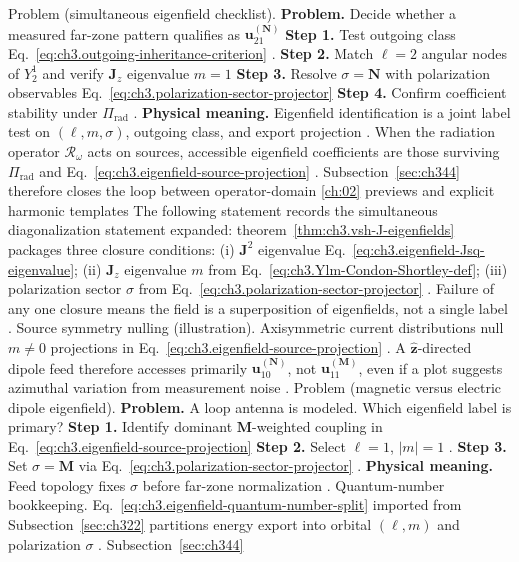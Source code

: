 Problem (simultaneous eigenfield checklist). \textbf{Problem.} Decide whether a measured far-zone pattern qualifies as \(\mathbf{u}_{21}^{(\mathbf{N})}\)
\textbf{Step 1.} Test outgoing class Eq.~\eqref{eq:ch3.outgoing-inheritance-criterion} .
\textbf{Step 2.} Match \(\ell=2\) angular nodes of \(Y_{2}^{1}\) and verify \(\mathbf{J}_{z}\) eigenvalue \(m=1\)
\textbf{Step 3.} Resolve \(\sigma=\mathbf{N}\) with polarization observables Eq.~\eqref{eq:ch3.polarization-sector-projector}
\textbf{Step 4.} Confirm coefficient stability under \(\Pi_{\mathrm{rad}}\) .
\textbf{Physical meaning.} Eigenfield identification is a joint label test on \((\ell,m,\sigma)\), outgoing class, and
export projection .
When the radiation operator \(\mathcal{R}_\omega\) acts on sources, accessible eigenfield coefficients are those surviving
\(\Pi_{\mathrm{rad}}\) and Eq.~\eqref{eq:ch3.eigenfield-source-projection} . Subsection~\ref{sec:ch344}
therefore closes the loop between operator-domain \ref{ch:02} previews and explicit harmonic templates
The following statement records the simultaneous diagonalization statement expanded: theorem~\ref{thm:ch3.vsh-J-eigenfields} packages three closure conditions: (i) \(\mathbf{J}^{2}\) eigenvalue
Eq.~\eqref{eq:ch3.eigenfield-Jsq-eigenvalue}; (ii) \(\mathbf{J}_{z}\) eigenvalue \(m\) from
Eq.~\eqref{eq:ch3.Ylm-Condon-Shortley-def}; (iii) polarization sector \(\sigma\) from
Eq.~\eqref{eq:ch3.polarization-sector-projector} . Failure of any one
closure means the field is a superposition of eigenfields, not a single label .
Source symmetry nulling (illustration). Axisymmetric current distributions null \(m\neq0\) projections in Eq.~\eqref{eq:ch3.eigenfield-source-projection}
. A \(\hat{\mathbf{z}}\)-directed dipole feed therefore accesses primarily
\(\mathbf{u}_{10}^{(\mathbf{N})}\), not \(\mathbf{u}_{11}^{(\mathbf{M})}\), even if a plot suggests azimuthal variation
from measurement noise .
Problem (magnetic versus electric dipole eigenfield). \textbf{Problem.} A loop antenna is modeled. Which eigenfield label is primary?
\textbf{Step 1.} Identify dominant \(\mathbf{M}\)-weighted coupling in Eq.~\eqref{eq:ch3.eigenfield-source-projection}
\textbf{Step 2.} Select \(\ell=1\), \(|m|=1\) .
\textbf{Step 3.} Set \(\sigma=\mathbf{M}\) via Eq.~\eqref{eq:ch3.polarization-sector-projector} .
\textbf{Physical meaning.} Feed topology fixes \(\sigma\) before far-zone normalization .
Quantum-number bookkeeping. Eq.~\eqref{eq:ch3.eigenfield-quantum-number-split} imported from Subsection~\ref{sec:ch322} partitions energy export
into orbital \((\ell,m)\) and polarization \(\sigma\) . Subsection~\ref{sec:ch344}
